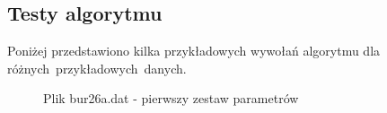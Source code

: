 \documentclass[12pt]{article}
\begin{document}
\subsection{Testy algorytmu}
Poniżej przedstawiono kilka przykładowych wywołań algorytmu dla różnych~przykładowych~danych.

\begin{figure}
\caption[Podpis_do_spisu]{Plik bur26a.dat - pierwszy zestaw parametrów}
\end{figure}
\end{document}
